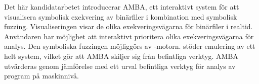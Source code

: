 Det här kandidatarbetet introducerar AMBA, ett interaktivt system för att visualisera symbolisk exekvering av binärfiler i kombination med symbolisk fuzzing.
Visualiseringen visar de olika exekveringsvägarna för binärfiler i realtid.
Användaren har möjlighet att interaktivt prioritera olika exekveringsvägarna för analys.
Den symboliska fuzzingen möjliggörs av \stoe{}-motorn.
\stoe{} stöder emulering av ett helt system, vilket gör att AMBA skiljer sig från befintliga verktyg.
AMBA utvärderas genom jämförelse med ett urval befintliga verktyg för analys av program på maskinnivå.